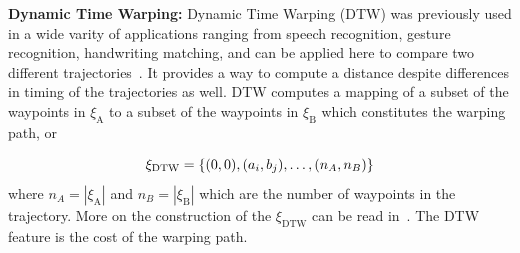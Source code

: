 \documentclass[letterpaper, 10 pt, conference]{ieeeconf}  %
\newcommand{\tj}[1]{\ensuremath{\xi_\text{#1}}}
\begin{document}
{\bf Dynamic Time Warping:} Dynamic Time Warping (DTW) was previously used in a wide varity of applications ranging from speech recognition, gesture recognition, handwriting matching, and can be applied here to compare two different trajectories~\cite{senin2008dynamic}. It provides a way to compute a distance despite differences in timing of the trajectories as well. DTW computes a mapping of a subset of the waypoints in $\xi_\text{A}$ to a subset of the waypoints in $\xi_\text{B}$ which constitutes the warping path, or

\begin{equation}
\xi_\text{DTW} = \{ (0, 0), (a_i, b_j), \mathellipsis ,(n_A, n_B) \}
\end{equation} where $n_A = |\tj{A}|$ and $n_B = |\tj{B}|$ which are the number of waypoints in the trajectory. More on the construction of the \tj{DTW} can be read in~\cite{senin2008dynamic}. The DTW feature is the cost of the warping path.

%
%
%
%
%
%
\end{document}

